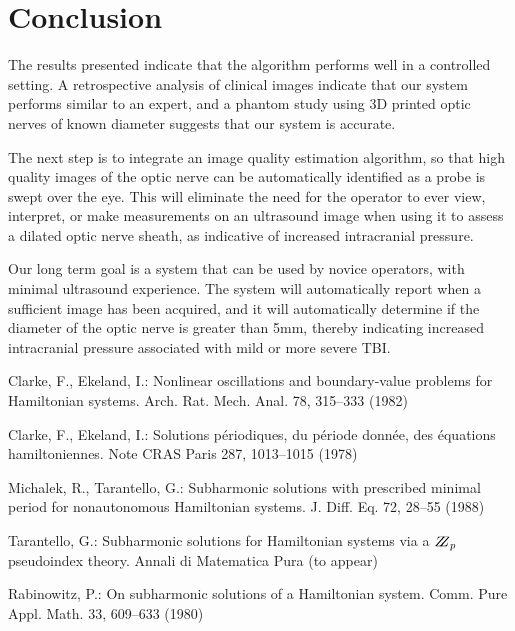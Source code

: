 \documentclass{llncs}
\begin{document}
\section{Conclusion}

The results presented indicate that the algorithm performs well in a controlled
setting.  A retrospective analysis of clinical images indicate that our system
performs similar to an expert, and a phantom study using 3D printed optic
nerves of known diameter suggests that our system is accurate.

The next step is to integrate an image quality estimation algorithm, so that
high quality images of the optic nerve can be automatically identified as a
probe is swept over the eye.   This will eliminate the need for the operator to
ever view, interpret, or make measurements on an ultrasound image when using it
to assess a dilated optic nerve sheath, as indicative of increased intracranial
pressure.

Our long term goal is a system that can be used by novice operators, with
minimal ultrasound experience.   The system will automatically report when a
sufficient image has been acquired, and it will automatically determine if the
diameter of the optic nerve is greater than 5mm, thereby indicating increased
intracranial pressure associated with mild or more severe TBI.


%
%
\begin{thebibliography}{}
%
Clarke, F., Ekeland, I.:
Nonlinear oscillations and
boundary-value problems for Hamiltonian systems.
Arch. Rat. Mech. Anal. 78, 315--333 (1982)

Clarke, F., Ekeland, I.:
Solutions p\'{e}riodiques, du
p\'{e}riode donn\'{e}e, des \'{e}quations hamiltoniennes.
Note CRAS Paris 287, 1013--1015 (1978)

Michalek, R., Tarantello, G.:
Subharmonic solutions with prescribed minimal
period for nonautonomous Hamiltonian systems.
J. Diff. Eq. 72, 28--55 (1988)

Tarantello, G.:
Subharmonic solutions for Hamiltonian
systems via a $\bbbz_{p}$ pseudoindex theory.
Annali di Matematica Pura (to appear)

Rabinowitz, P.:
On subharmonic solutions of a Hamiltonian system.
Comm. Pure Appl. Math. 33, 609--633 (1980)

\end{thebibliography}
\end{document}
